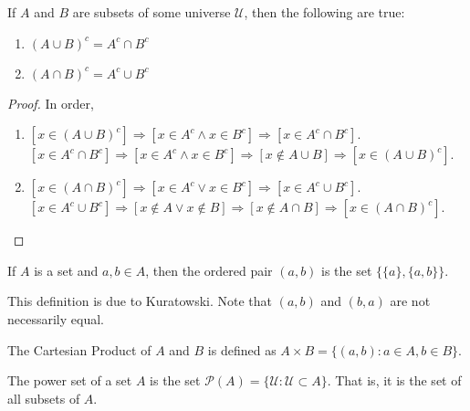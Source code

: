 \documentclass[crop=false,class=article,oneside]{standalone}
\begin{document}
        \begin{theorem}
        If $A$ and $B$ are subsets of some universe $\mathcal{U}$, then the following are true:
        \begin{enumerate}
        \item $(A\cup B)^c = A^c \cap B^c$
        \item $(A\cap B)^c = A^c \cup B^c$
        \end{enumerate}
        \end{theorem}
        \begin{proof}
        In order,
        \begin{enumerate}
        \item $[x\in (A\cup B)^c]\Rightarrow [x\in A^c\land x\in B^c]\Rightarrow [x\in A^c\cap B^c]$. $[x\in A^c \cap B^c]\Rightarrow [x\in A^c\land x\in B^c]\Rightarrow [x\notin A\cup B]\Rightarrow [x\in (A\cup B)^c]$.
        \item $[x\in (A\cap B)^c]\Rightarrow [x\in A^c\lor x\in B^c]\Rightarrow [x\in A^c \cup B^c]$. $[x\in A^c \cup B^c]\Rightarrow [x\notin A\lor x\notin B]\Rightarrow [x\notin A\cap B]\Rightarrow [x\in (A\cap B)^c]$.
        \end{enumerate}
        \end{proof}
        \begin{definition}
        If $A$ is a set and $a,b\in A$, then the ordered pair $(a,b)$ is the set $\{\{a\},\{a,b\}\}$.
        \end{definition}
        \begin{remark}
        This definition is due to Kuratowski. Note that $(a,b)$ and $(b,a)$ are not necessarily equal.
        \end{remark}
        \begin{definition}
        The Cartesian Product of $A$ and $B$ is defined as $A\times B = \{(a,b):a\in A, b\in B\}$.
        \end{definition}
        \begin{definition}
        The power set of a set $A$ is the set $\mathcal{P}(A) = \{\mathcal{U}:\mathcal{U}\subset A\}$. That is, it is the set of all subsets of $A$.
        \end{definition}
\end{document}
